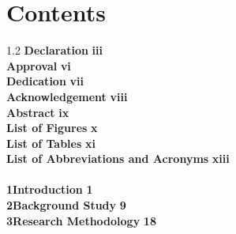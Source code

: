 \documentclass[12pt,a4paper]{report}
\begin{document}
\setcounter{page}{14}

\chapter*{Contents}
\vspace{-1.5em}

\begin{spacing}{1.2}
\noindent\textbf{Declaration} \dotfill \textbf{iii}\\
\textbf{Approval} \dotfill \textbf{vi}\\
\textbf{Dedication} \dotfill \textbf{vii}\\
\textbf{Acknowledgement} \dotfill \textbf{viii}\\
\textbf{Abstract} \dotfill \textbf{ix}\\
\textbf{List of Figures} \dotfill \textbf{x}\\
\textbf{List of Tables} \dotfill \textbf{xi}\\
\textbf{List of Abbreviations and Acronyms} \dotfill \textbf{xiii}\\
\\
\textbf{1\hspace{1em}Introduction} \dotfill \textbf{1}\\
\textbf{2\hspace{1em}Background Study} \dotfill \textbf{9}\\
\textbf{3\hspace{1em}Research Methodology} \dotfill \textbf{18}\\
\end{spacing}
\end{document}
